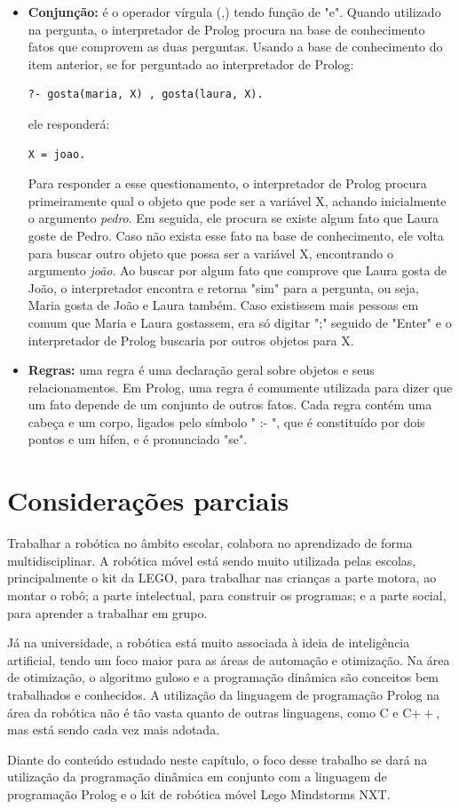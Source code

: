 \begin{itemize}
\item \textbf{Conjunção:} é o operador vírgula (,) tendo função de "e". Quando utilizado na pergunta, o interpretador de Prolog procura na base de conhecimento fatos que comprovem as duas perguntas. Usando a base de conhecimento do item anterior, se for perguntado ao interpretador de Prolog: 
\lstset{language=Prolog}
\begin{lstlisting}
?- gosta(maria, X) , gosta(laura, X).
\end{lstlisting}
ele responderá:
\lstset{language=Prolog}
\begin{lstlisting}
X = joao.
\end{lstlisting}
Para responder a esse questionamento, o interpretador de Prolog procura primeiramente qual o objeto que pode ser a variável X, achando inicialmente o argumento \textit{pedro}. Em seguida, ele procura se existe algum fato que Laura goste de Pedro. Caso não exista esse fato na base de conhecimento, ele volta para buscar outro objeto que possa ser a variável X, encontrando o argumento \textit{joão}. Ao buscar por algum fato que comprove que Laura gosta de João, o interpretador encontra e retorna "sim" para a pergunta, ou seja, Maria gosta de João e Laura também. Caso existissem mais pessoas em comum que Maria e Laura gostassem, era só digitar ";" seguido de "Enter" e o interpretador de Prolog buscaria por outros objetos para X.
\item \textbf{Regras:} uma regra é uma declaração geral sobre objetos e seus relacionamentos. Em Prolog, uma regra é comumente utilizada para dizer que um fato depende de um conjunto de outros fatos. Cada regra contém uma cabeça e um corpo, ligados pelo símbolo " :- ", que é constituído por dois pontos e um hífen, e é pronunciado "se". 
\end{itemize}

\section{Considerações parciais}
Trabalhar a robótica no âmbito escolar, colabora no aprendizado de forma multidisciplinar. A robótica móvel está sendo muito utilizada pelas escolas, principalmente o kit da LEGO, para trabalhar nas crianças a parte motora, ao montar o robô; a parte intelectual, para construir os programas; e a parte social, para aprender a trabalhar em grupo.

Já na universidade, a robótica está muito associada à ideia de inteligência artificial, tendo um foco maior para as áreas de automação e otimização. Na área de otimização, o algoritmo guloso e a programação dinâmica são conceitos bem trabalhados e conhecidos. A utilização da linguagem de programação Prolog na área da robótica não é tão vasta quanto de outras linguagens, como C e C$++$, mas está sendo cada vez mais adotada. 

Diante do conteúdo estudado neste capítulo, o foco desse trabalho se dará na utilização da programação dinâmica em conjunto com a linguagem de programação Prolog e o kit de robótica móvel Lego Mindstorms NXT. 